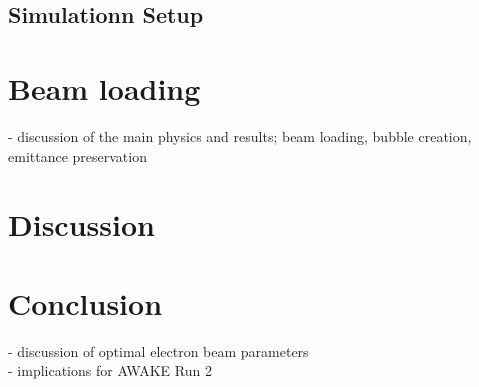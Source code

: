 \documentclass[aps,prstab,reprint,groupedaddress]{revtex4-1}
\begin{document}
\subsection[\label{S:M:Setup}]{Simulationn Setup}



\section[\label{S:BL}]{Beam loading}

- discussion of the main physics and results; beam loading, bubble creation, emittance preservation \\

\section[\label{S:D}]{Discussion}
\section[\label{S:C}]{Conclusion}

- discussion of optimal electron beam parameters \\
- implications for AWAKE Run 2 \\



\end{document}
